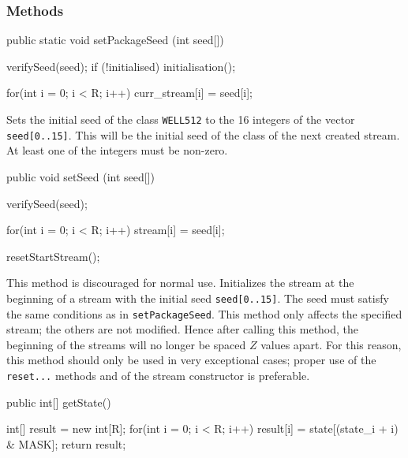 \subsubsection* {Methods}
\begin{code}
   public static void setPackageSeed (int seed[]) \begin{hide} {
      verifySeed(seed);
      if (!initialised)
         initialisation();

      for(int i = 0; i < R; i++)
         curr_stream[i] = seed[i];
   } \end{hide}
\end{code}
\begin{tabb} Sets the initial seed of the class \texttt{WELL512} to the 16
  integers of the vector \texttt{seed[0..15]}.
  This will be the initial seed of the class of the next created stream.
  At least one of the integers must be non-zero.
\end{tabb}
\begin{htmlonly}
\end{htmlonly}
\begin{code}

   public void setSeed (int seed[]) \begin{hide} {
      verifySeed(seed);

      for(int i = 0; i < R; i++)
         stream[i] = seed[i];

      resetStartStream();
   } \end{hide}
\end{code}
\begin{tabb} This method is discouraged for normal use.
  Initializes the stream at the beginning of a stream with the initial
  seed \texttt{seed[0..15]}. The seed must satisfy the same
  conditions as in \texttt{setPackageSeed}.
  This method only affects the specified stream; the others are not
  modified.  Hence after calling this method, the beginning of the streams
  will no longer be spaced $Z$ values apart.
  For this reason, this method should only be used in very exceptional cases;
  proper use of the \texttt{reset...} methods and of the stream constructor is
  preferable.
\end{tabb}
\begin{htmlonly}
\end{htmlonly}
\begin{code}

   public int[] getState() \begin{hide} {
      int[] result = new int[R];
      for(int i = 0; i < R; i++)
         result[i] = state[(state_i + i) & MASK];
      return result;
   } \end{hide}
\end{code}
